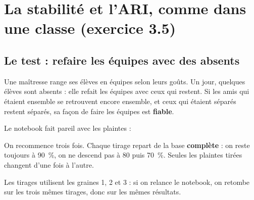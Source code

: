
\section{La stabilité et l'ARI, comme dans une classe (exercice 3.5)}

\subsection{Le test : refaire les équipes avec des absents}

Une maîtresse range ses élèves en équipes selon leurs goûts. Un jour, quelques élèves sont absents : elle
refait les équipes avec ceux qui restent. Si les amis qui étaient ensemble se retrouvent encore ensemble,
et ceux qui étaient séparés restent séparés, sa façon de faire les équipes est \textbf{fiable}.

Le notebook fait pareil avec les plaintes :
\begin{center}
\end{center}

\begin{tcbraster}[raster columns=2, raster equal height, raster column skip=8pt, raster every box/.style={unbreakable}]
\begin{conceptbox}[title={\faRedo\ Trois fois}, unbreakable]
\small On recommence trois fois. Chaque tirage repart de la base \textbf{complète} : on reste toujours à
90~\%, on ne descend pas à 80 puis 70~\%. Seules les plaintes tirées changent d'une fois à l'autre.
\end{conceptbox}
\begin{conceptbox}[title={\faDiceThree\ Un hasard fixé}, unbreakable]
\small Les tirages utilisent les graines 1, 2 et 3 : si on relance le notebook, on retombe sur les trois
mêmes tirages, donc sur les mêmes résultats.
\end{conceptbox}
\end{tcbraster}

